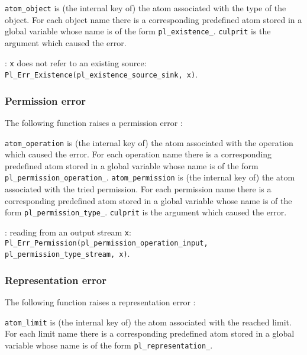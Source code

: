 
\texttt{atom\_object} is (the internal key of) the atom associated with the
type of the object. For each object name  there is a
corresponding predefined atom stored in a global variable whose name is of
the form \texttt{pl\_existence\_}. \texttt{culprit} is the argument
which caused the error.

: \texttt{x} does not refer to an existing source:
\texttt{Pl\_Err\_Existence(pl\_existence\_source\_sink, x)}.

\subsubsection{Permission error}
The following function raises a permission error :


\texttt{atom\_operation} is (the internal key of) the atom associated with the
operation which caused the error. For each operation name
 there is a corresponding predefined atom stored in a
global variable whose name is of the form
\texttt{pl\_permission\_operation\_}. \texttt{atom\_permission} is
(the internal key of) the atom associated with the tried permission. For each
permission name  there is a corresponding predefined atom
stored in a global variable whose name is of the form
\texttt{pl\_permission\_type\_}. \texttt{culprit} is the argument
which caused the error.

: reading from an output stream \texttt{x}:
\texttt{Pl\_Err\_Permission(pl\_permission\_operation\_input, \\
pl\_permission\_type\_stream, x)}.

\subsubsection{Representation error}
The following function raises a representation error :


\texttt{atom\_limit} is (the internal key of) the atom associated with the
reached limit. For each limit name  there is a
corresponding predefined atom stored in a global variable whose name is of
the form \texttt{pl\_representation\_}.

